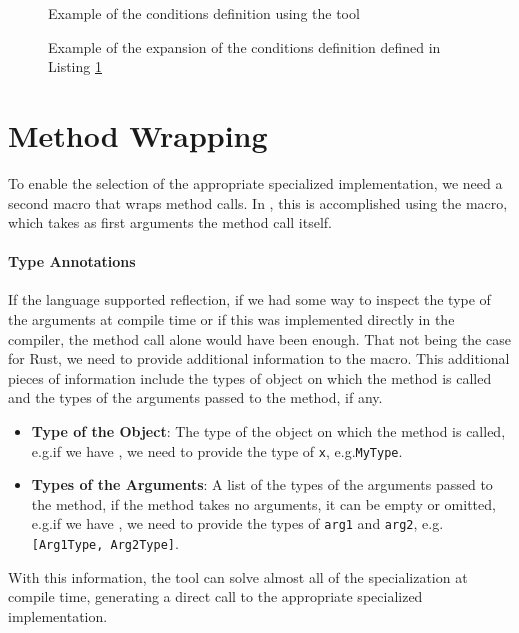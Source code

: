 \begin{figure}[htbp!]
	\centering
	\captionsetup{type=listing,skip=2pt}
	\caption{Example of the conditions definition using the tool}
	\label{fig:conditions-definition-pre}
\end{figure}

\begin{figure}[htbp!]
	\centering
	\captionsetup{type=listing,skip=2pt}
	\caption{Example of the expansion of the conditions definition defined in Listing \ref{fig:conditions-definition-pre}}
	\label{fig:conditions-definition-post}
\end{figure}


\section{Method Wrapping}\label{sec:method_wrapping}
To enable the selection of the appropriate specialized implementation, we need a second macro that wraps method calls.
In \mytool{}, this is accomplished using the  macro, which takes as first arguments the method call itself.

\paragraph{Type Annotations}
If the language supported reflection, if we had some way to inspect the type of the arguments at compile time or if this was implemented directly in the compiler, the method call alone would have been enough.
That not being the case for Rust, we need to provide additional information to the macro.
This additional pieces of information include the types of object on which the method is called and the types of the arguments passed to the method, if any.
\begin{itemize}
	\item \textbf{Type of the Object}: The type of the object on which the method is called, e.g.\@ if we have , we need to provide the type of \texttt{x}, e.g.\@ \mbox{\texttt{MyType}}.
	\item \textbf{Types of the Arguments}: A list of the types of the arguments passed to the method, if the method takes no arguments, it can be empty or omitted, e.g.\@ if we have , we need to provide the types of \texttt{arg1} and \texttt{arg2}, e.g.\@ \mbox{\texttt{[Arg1Type, Arg2Type]}}.
\end{itemize}
With this information, the tool can solve almost all of the specialization at compile time, generating a direct call to the appropriate specialized implementation.

